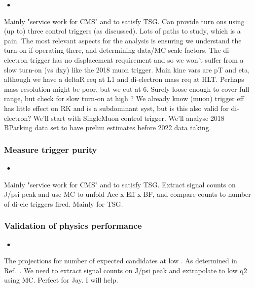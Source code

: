 \begin{itemize}
\item 
\end{itemize}

Mainly "service work for CMS" and to satisfy TSG. Can provide turn ons
using (up to) three control triggers (as discussed). Lots of paths to
study, which is a pain. The most relevant aspects for the analysis is
ensuring we understand the turn-on if operating there, and determining
data/MC scale factors. The di-electron trigger has no displacement
requirement and so we won't suffer from a slow turn-on (vs dxy) like
the 2018 muon trigger. Main kine vars are pT and eta, although we have
a deltaR req at L1 and di-electron mass req at HLT. Perhaps mass
resolution might be poor, but we cut at 6\GeV. Surely loose enough to
cover full \qsq range, but check for slow turn-on at high \qsq? We
already know (muon) trigger eff has little effect on RK and is a
subdominant syst, but is this also valid for di-electron? We'll start
with SingleMuon control trigger. We'll analyse 2018 BParking data set
to have prelim estimates before 2022 data taking.

\subsubsection{Measure trigger purity}

\begin{itemize}
\item 
\end{itemize}

Mainly "service work for CMS" and to satisfy TSG. Extract signal
counts on J/psi peak and use MC to unfold Acc x Eff x BF, and compare
counts to number of di-ele triggers fired. Mainly for TSG.

\subsubsection{Validation of physics performance}



\begin{itemize}
\item 
\end{itemize}

The projections for number of expected candidates at low \qsq. As
determined in Ref.~\cite{AN-21-160}. We need to extract signal counts
on J/psi peak and extrapolate to low q2 using MC. Perfect for Jay. I
will help.

